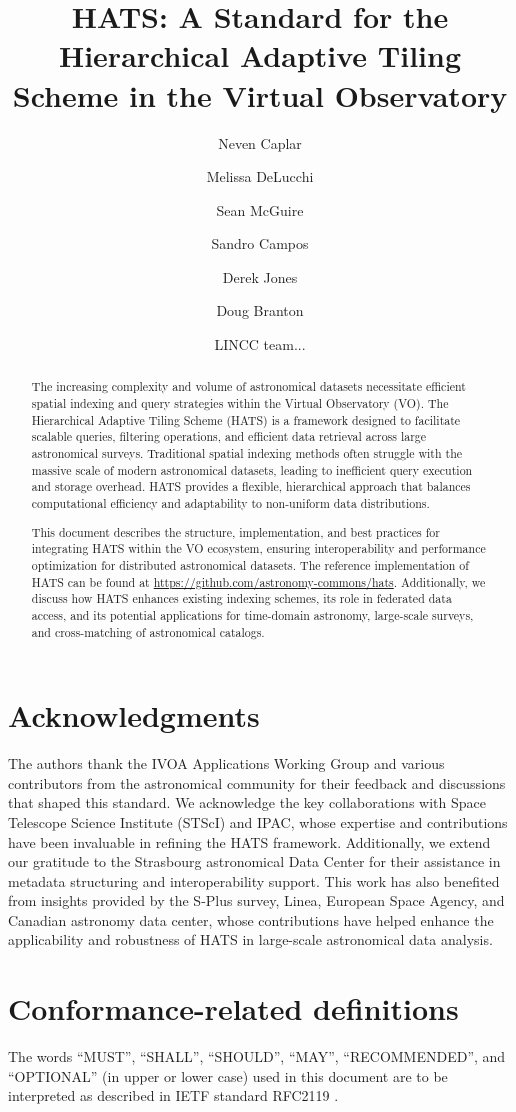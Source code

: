 \documentclass[11pt,a4paper]{ivoa}
\title{HATS: A Standard for the Hierarchical Adaptive Tiling Scheme in the Virtual Observatory}
\author[https://www.ivoa.net/authors/caplar]{Neven Caplar}
\author[https://www.ivoa.net/authors/usher]{Melissa DeLucchi}
\author[https://www.ivoa.net/authors/caplar]{Sean McGuire}
\author[https://www.ivoa.net/authors/usher]{Sandro Campos}
\author[https://www.ivoa.net/authors/caplar]{Derek Jones}
\author[https://www.ivoa.net/authors/usher]{Doug Branton}
\author[https://www.ivoa.net/authors/offline]{LINCC team...}
\begin{document}
\begin{abstract}
    The increasing complexity and volume of astronomical datasets necessitate efficient spatial indexing and query strategies within the Virtual Observatory (VO). The Hierarchical Adaptive Tiling Scheme (HATS) is a framework designed to facilitate scalable queries, filtering operations, and efficient data retrieval across large astronomical surveys. Traditional spatial indexing methods often struggle with the massive scale of modern astronomical datasets, leading to inefficient query execution and storage overhead. HATS provides a flexible, hierarchical approach that balances computational efficiency and adaptability to non-uniform data distributions.

    This document describes the structure, implementation, and best practices for integrating HATS within the VO ecosystem, ensuring interoperability and performance optimization for distributed astronomical datasets. The reference implementation of HATS can be found at \url{https://github.com/astronomy-commons/hats}. Additionally, we discuss how HATS enhances existing indexing schemes, its role in federated data access, and its potential applications for time-domain astronomy, large-scale surveys, and cross-matching of astronomical catalogs.
\end{abstract}

\section*{Acknowledgments}
    The authors thank the IVOA Applications Working Group and various contributors from the astronomical community for their feedback and discussions that shaped this standard. We acknowledge the key collaborations with Space Telescope Science Institute (STScI) and IPAC, whose expertise and contributions have been invaluable in refining the HATS framework. Additionally, we extend our gratitude to  the Strasbourg astronomical Data Center for their assistance in metadata structuring and interoperability support. This work has also benefited from insights provided by the S-Plus survey, Linea, European Space Agency, and Canadian astronomy data center, whose contributions have helped enhance the applicability and robustness of HATS in large-scale astronomical data analysis.


\section*{Conformance-related definitions}
The words ``MUST'', ``SHALL'', ``SHOULD'', ``MAY'', ``RECOMMENDED'', and
``OPTIONAL'' (in upper or lower case) used in this document are to be
interpreted as described in IETF standard RFC2119 \citep{std:RFC2119}.
\end{document}
